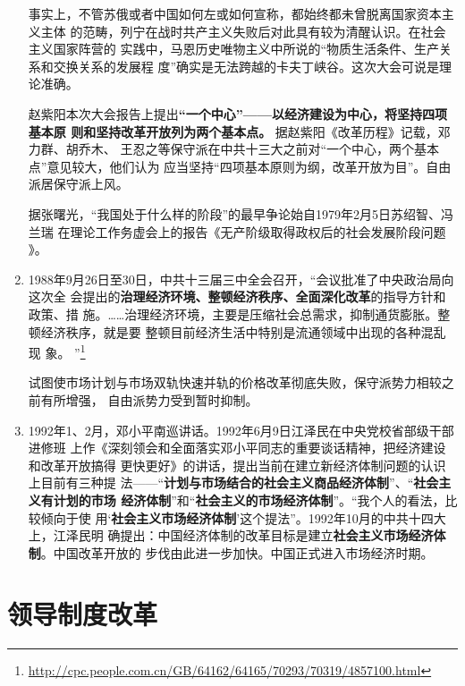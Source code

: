\begin{enumerate}
  事实上，不管苏俄或者中国如何左或如何宣称，都始终都未曾脱离国家资本主义主体
  的范畴，列宁在战时共产主义失败后对此具有较为清醒认识。在社会主义国家阵营的
  实践中，马恩历史唯物主义中所说的“物质生活条件、生产关系和交换关系的发展程
  度”确实是无法跨越的卡夫丁峡谷。这次大会可说是理论准确。

  赵紫阳本次大会报告上提出\textbf{“一个中心”——以经济建设为中心，将坚持四项基本原
  则和坚持改革开放列为两个基本点。} 据赵紫阳《改革历程》记载，邓力群、胡乔木、
  王忍之等保守派在中共十三大之前对“一个中心，两个基本点”意见较大，他们认为
  应当坚持“四项基本原则为纲，改革开放为目”。自由派居保守派上风。

  据张曙光，“我国处于什么样的阶段”的最早争论始自1979年2月5日苏绍智、冯兰瑞
  在理论工作务虚会上的报告《无产阶级取得政权后的社会发展阶段问题
  》。

\item 1988年9月26日至30日，中共十三届三中全会召开，“会议批准了中央政治局向这次全
  会提出的\textbf{治理经济环境、整顿经济秩序、全面深化改革}的指导方针和政策、措
  施。……治理经济环境，主要是压缩社会总需求，抑制通货膨胀。整顿经济秩序，就是要
  整顿目前经济生活中特别是流通领域中出现的各种混乱现
  象。
  ”\footnote{\url{http://cpc.people.com.cn/GB/64162/64165/70293/70319/4857100.html}}

  试图使市场计划与市场双轨快速并轨的价格改革彻底失败，保守派势力相较之前有所增强，
  自由派势力受到暂时抑制。

\item 1992年1、2月，邓小平南巡讲话。1992年6月9日江泽民在中央党校省部级干部进修班
  上作《深刻领会和全面落实邓小平同志的重要谈话精神，把经济建设和改革开放搞得
  更快更好》的讲话，提出当前在建立新经济体制问题的认识上目前有三种提
  法——“\textbf{计划与市场结合的社会主义商品经济体制}”、“\textbf{社会主义有计划的市场
    经济体制}”和“\textbf{社会主义的市场经济体制}”。“我个人的看法，比较倾向于使
  用‘\textbf{社会主义市场经济体制}’这个提法”。1992年10月的中共十四大上，江泽民明
  确提出：中国经济体制的改革目标是建立\textbf{社会主义市场经济体制}。中国改革开放的
  步伐由此进一步加快。中国正式进入市场经济时期。
\end{enumerate}

\section{领导制度改革}


